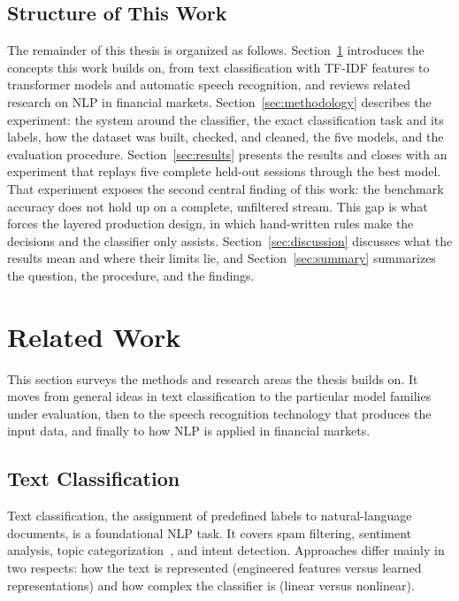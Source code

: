 \subsection{Structure of This Work}
\label{sec:structure}

The remainder of this thesis is organized as follows. Section~\ref{sec:related_work} introduces the concepts this work builds on, from text classification with TF-IDF features to transformer models and automatic speech recognition, and reviews related research on NLP in financial markets. Section~\ref{sec:methodology} describes the experiment: the system around the classifier, the exact classification task and its labels, how the dataset was built, checked, and cleaned, the five models, and the evaluation procedure. Section~\ref{sec:results} presents the results and closes with an experiment that replays five complete held-out sessions through the best model. That experiment exposes the second central finding of this work: the benchmark accuracy does not hold up on a complete, unfiltered stream. This gap is what forces the layered production design, in which hand-written rules make the decisions and the classifier only assists. Section~\ref{sec:discussion} discusses what the results mean and where their limits lie, and Section~\ref{sec:summary} summarizes the question, the procedure, and the findings.



\section{Related Work}
\label{sec:related_work}

This section surveys the methods and research areas the thesis builds on. It moves from general ideas in text classification to the particular model families under evaluation, then to the speech recognition technology that produces the input data, and finally to how NLP is applied in financial markets.

\subsection{Text Classification}
\label{sec:text_classification}

Text classification, the assignment of predefined labels to natural-language documents, is a foundational NLP task. It covers spam filtering, sentiment analysis, topic categorization~\cite{kowsari2019text}, and intent detection. Approaches differ mainly in two respects: how the text is represented (engineered features versus learned representations) and how complex the classifier is (linear versus nonlinear).


